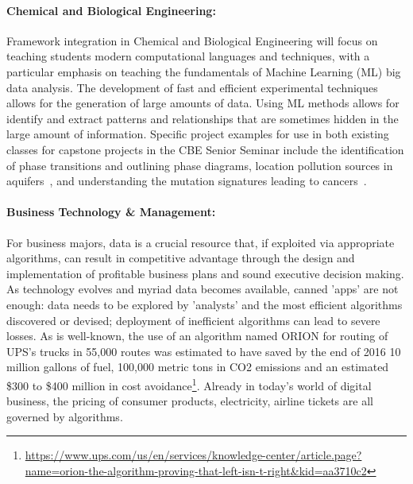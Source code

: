 \paragraph{Chemical and Biological Engineering:}
Framework integration in Chemical and Biological Engineering will focus on teaching students modern computational languages and techniques, with a particular emphasis on teaching the fundamentals of Machine Learning (ML) big data analysis. The development of fast and efficient experimental techniques allows for the generation of large amounts of data. Using ML methods allows for identify and extract patterns and relationships that are sometimes hidden in the large amount of information. Specific project examples for use in both existing classes for capstone projects in the CBE Senior Seminar include the identification of phase transitions and outlining phase diagrams\cite{cbe1}, location pollution sources in aquifers~\cite{cbe2}, and understanding the mutation signatures leading to cancers~\cite{cbe3}.



\paragraph{Business Technology \& Management:}
For business majors, data is a crucial resource that, if exploited via appropriate algorithms, can result in competitive advantage through the design and implementation of profitable business plans and sound executive decision making. As technology evolves and myriad data becomes available, canned 'apps' are not enough: data needs to be explored by 'analysts' and the most efficient algorithms discovered or
devised; deployment of inefficient algorithms can lead to severe losses.  As is well-known, the use of an algorithm named ORION for routing of UPS's trucks in 55,000 routes was estimated to have saved by the end of 2016 10 million gallons of fuel, 100,000 metric tons in CO2 emissions and an estimated \$300 to \$400 million in cost avoidance\footnote{\url{https://www.ups.com/us/en/services/knowledge-center/article.page?name=orion-the-algorithm-proving-that-left-isn-t-right&kid=aa3710c2}}. Already in today's world of digital business, the pricing of consumer products, electricity, airline tickets are all governed by algorithms.

